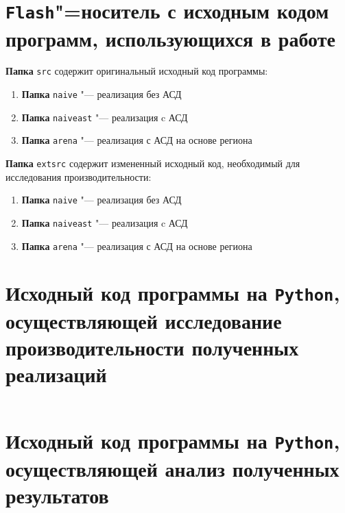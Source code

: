 \section{\textbf{\texttt{Flash}"=носитель с исходным кодом программ, использующихся в работе}}
{
\raggedright
\textbf{Папка} \texttt{src} содержит оригинальный исходный код программы:
}

\begin{enumerate}
    \item[] \textbf{Папка} \texttt{naive} "--- реализация без АСД
    \item[] \textbf{Папка} \texttt{naiveast} "--- реализация c АСД
    \item[] \textbf{Папка} \texttt{arena} "--- реализация с АСД на основе 
    региона
\end{enumerate}

{
\raggedright
\textbf{Папка} \texttt{extsrc} содержит измененный исходный код, необходимый для исследования производительности:
}

\begin{enumerate}
    \item[] \textbf{Папка} \texttt{naive} "--- реализация без АСД
    \item[] \textbf{Папка} \texttt{naiveast} "--- реализация c АСД
    \item[] \textbf{Папка} \texttt{arena} "--- реализация с АСД на основе 
    региона
\end{enumerate}
\label{app:first}

\section{Исходный код программы на \texttt{Python}, осуществляющей исследование
производительности полученных реализаций}
\inputminted{python}{requirements/src/test.py}
\label{app:second}

\section{Исходный код программы на \texttt{Python}, осуществляющей анализ полученных 
результатов}
\inputminted{python}{requirements/src/graph.py}
\label{app:third}